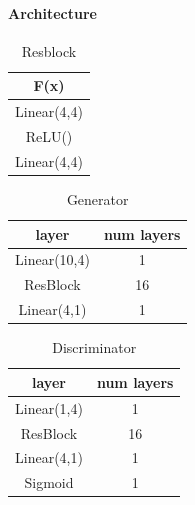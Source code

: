 \documentclass[10pt,twocolumn,letterpaper]{article}
\begin{document}
\paragraph{Architecture}


\begin{table}[ht]
\caption{Resblock} %
\centering %
\begin{tabular}{c} %
\hline\hline %
F(x)\\%
\hline %
Linear(4,4)\\ %
ReLU() \\
Linear(4,4) \\
\hline %
\end{tabular}
\label{table:resblock} %
\end{table}


\begin{table}[ht]
\caption{Generator} %
\centering %
\begin{tabular}{c c} %
\hline\hline %
layer & num layers\\%
\hline %
Linear(10,4) & 1\\ %
ResBlock & 16 \\
Linear(4,1) & 1 \\
\hline %
\end{tabular}
\label{table:1d_G} %
\end{table}

\begin{table}[ht]
\caption{Discriminator} %
\centering %
\begin{tabular}{c c} %
\hline\hline %
layer & num layers\\%
\hline %
Linear(1,4) & 1\\ %
ResBlock & 16 \\
Linear(4,1) & 1 \\
Sigmoid & 1 \\
\hline %
\end{tabular}
\label{table:1d_D} %
\end{table}
\end{document}
